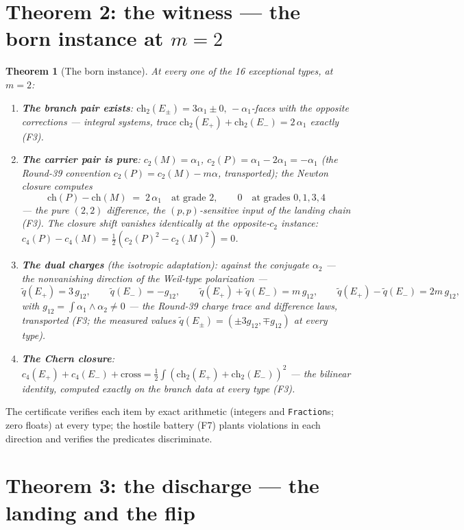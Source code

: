 \documentclass[11pt]{article}
\newtheorem{theorem}{Theorem}
\begin{document}
\section{Theorem 2: the witness --- the born instance at $m = 2$}

\begin{theorem}[The born instance]\label{thm:witness}
At every one of the 16 exceptional types, at $m = 2$:
\begin{enumerate}
\item \textbf{The branch pair exists}: $\mathrm{ch}_2(E_\pm) = 3\alpha_1 \pm 0,\,
-\alpha_1$-faces with the opposite corrections --- integral systems, trace
$\mathrm{ch}_2(E_+) + \mathrm{ch}_2(E_-) = 2\,\alpha_1$ exactly (F3).
\item \textbf{The carrier pair is pure}: $c_2(M) = \alpha_1$, $c_2(P) = \alpha_1 - 2\alpha_1 =
-\alpha_1$ (the Round-39 convention $c_2(P) = c_2(M) - m\alpha$, transported); the Newton
closure computes
\[
\mathrm{ch}(P) - \mathrm{ch}(M) \;=\; 2\,\alpha_1 \quad \text{at grade 2}, \qquad
0 \quad \text{at grades } 0, 1, 3, 4
\]
--- the \emph{pure $(2,2)$ difference}, the $(p,p)$-sensitive input of the landing chain (F3).
The closure shift vanishes identically at the opposite-$c_2$ instance: $c_4(P) - c_4(M) =
\tfrac{1}{2}(c_2(P)^2 - c_2(M)^2) = 0$.
\item \textbf{The dual charges} (the isotropic adaptation): against the conjugate $\alpha_2$ ---
the nonvanishing direction of the Weil-type polarization ---
\[
\tilde q(E_+) = 3\,g_{12}, \qquad \tilde q(E_-) = -g_{12}, \qquad
\tilde q(E_+) + \tilde q(E_-) = m\,g_{12}, \qquad
\tilde q(E_+) - \tilde q(E_-) = 2m\,g_{12},
\]
with $g_{12} = \int \alpha_1 \wedge \alpha_2 \neq 0$ --- the Round-39 charge trace and
difference laws, transported (F3; the measured values
$\tilde q(E_\pm) = (\pm 3g_{12}, \mp g_{12})$ at every type).
\item \textbf{The Chern closure}: $c_4(E_+) + c_4(E_-) + \mathrm{cross} =
\tfrac{1}{2}\int (\mathrm{ch}_2(E_+) + \mathrm{ch}_2(E_-))^2$ --- the bilinear identity,
computed exactly on the branch data at every type (F3).
\end{enumerate}
\end{theorem}

The certificate verifies each item by exact arithmetic (integers and \texttt{Fraction}s; zero
floats) at every type; the hostile battery (F7) plants violations in each direction and
verifies the predicates discriminate.

\section{Theorem 3: the discharge --- the landing and the flip}
\end{document}
